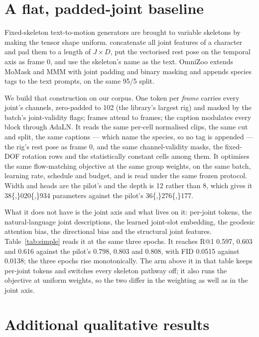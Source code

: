 \section{A flat, padded-joint baseline}\label{app:flat}

Fixed-skeleton text-to-motion generators are brought to variable skeletons by making the tensor shape uniform.
\citet{gat2025anytop} concatenate all joint features of a character and pad them to a length of $J\times D$, put
the vectorised rest pose on the temporal axis as frame 0, and use the skeleton's name as the text. OmniZoo
\citep{chen2025omnizoo} extends MoMask and MMM with joint padding and binary masking and appends species tags
to the text prompts, on the same 95/5 split.

We build that construction on our corpus. One token per \emph{frame} carries every joint's channels, zero-padded
to \num{102} (the library's largest rig) and masked by the batch's joint-validity flags; frames attend to frames;
the caption modulates every block through AdaLN. It reads the same per-cell normalised clips, the same cut and
split, the same captions --- which name the species, so no tag is appended --- the rig's rest pose as frame 0,
and the same channel-validity masks, the fixed-DOF rotation rows and the statistically constant cells among
them. It optimises the same flow-matching objective at the same group weights, on the same batch, learning rate,
schedule and budget, and is read under the same frozen protocol. Width and heads are the pilot's and the depth
is \num{12} rather than \num{8}, which gives it \num{38{,}020{,}934} parameters against the pilot's
\num{36{,}276{,}177}.

What it does not have is the joint axis and what lives on it: per-joint tokens, the natural-language joint
descriptions, the learned joint-slot embedding, the geodesic attention bias, the directional bias and the
structural joint features. Table~\ref{tab:simple} reads it at the same three epochs. It reaches R@1
\num{0.597}, \num{0.603} and \num{0.616} against the pilot's \num{0.798}, \num{0.803} and \num{0.808}, with FID
\num{0.0515} against \num{0.0138}; the three epochs rise monotonically. The arm above it in that table keeps
per-joint tokens and switches every skeleton pathway off; it also runs the objective at uniform weights, so the
two differ in the weighting as well as in the joint axis.


\section{Additional qualitative results}\label{app:qual}

